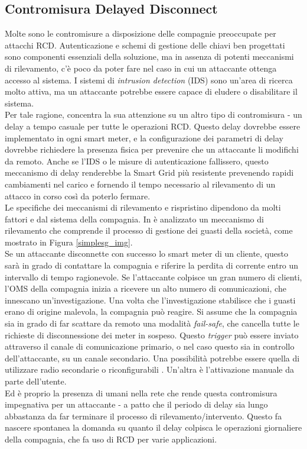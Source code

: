\subsection{Contromisura Delayed Disconnect}
Molte sono le contromisure a disposizione delle compagnie preoccupate per attacchi RCD. Autenticazione e schemi di gestione delle chiavi ben progettati sono componenti essenziali della soluzione, ma in assenza di potenti meccanismi di rilevamento, c'è poco da poter fare nel caso in cui un attaccante ottenga accesso al sistema. I sistemi di \emph{intrusion detection} (IDS) sono un'area di ricerca molto attiva, ma un attaccante potrebbe essere capace di eludere o disabilitare il sistema.\\
Per tale ragione, \cite{delay} concentra la sua attenzione su un altro tipo di contromisura - un delay a tempo casuale per tutte le operazioni RCD. Questo delay dovrebbe essere implementato in ogni smart meter, e la configurazione dei parametri di delay dovrebbe richiedere la presenza fisica per prevenire che un attaccante li modifichi da remoto. Anche se l'IDS o le misure di autenticazione fallissero, questo meccanismo di delay renderebbe la Smart Grid più resistente prevenendo rapidi cambiamenti nel carico e fornendo il tempo necessario al rilevamento di un attacco in corso così da poterlo fermare.\\
Le specifiche dei meccanismi di rilevamento e rispristino dipendono da molti fattori e dal sistema della compagnia. In \cite{delay} è analizzato un meccanismo di rilevamento che comprende il processo di gestione dei guasti della società, come mostrato in Figura \ref{simplesg_img}.\\
Se un attaccante disconnette con successo lo smart meter di un cliente, questo sarà in grado di contattare la compagnia e riferire la perdita di corrente entro un intervallo di tempo ragionevole. Se l'attaccante colpisce un gran numero di clienti, l'OMS della compagnia inizia a ricevere un alto numero di comunicazioni, che innescano un'investigazione. Una volta che l'investigazione stabilisce che i guasti erano di origine malevola, la compagnia può reagire. Si assume che la compagnia sia in grado di far scattare da remoto una modalità \textit{fail-safe}, che cancella tutte le richieste di disconnessione dei meter in sospeso. Questo \emph{trigger} può essere inviato attraverso il canale di comunicazione primario, o nel caso questo sia in controllo dell'attaccante, su un canale secondario. Una possibilità potrebbe essere quella di utilizzare radio secondarie o riconfigurabili \cite{radio}. Un'altra è l'attivazione manuale da parte dell'utente.\\
Ed è proprio la presenza di umani nella rete che rende questa contromisura impegnativa per un attaccante - a patto che il periodo di delay sia lungo abbastanza da far terminare il processo di rilevamento/intervento. Questo fa nascere spontanea la domanda su quanto il delay colpisca le operazioni giornaliere della compagnia, che fa uso di RCD per varie applicazioni.
